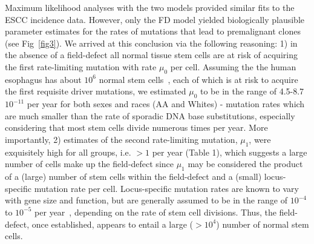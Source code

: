 \documentclass[10pt,letterpaper]{article}
\begin{document}
Maximum likelihood analyses with the two models provided similar fits to the ESCC incidence data. However, only the FD model yielded biologically plausible parameter estimates for the rates of mutations that lead to premalignant clones (see Fig~\ref{fig3}). We arrived at this conclusion via the following reasoning: 1) in the absence of a field-defect all normal tissue stem cells are at risk of acquiring the first rate-limiting mutation with rate $\mu_0$ per cell. Assuming the the human esophagus has about $10^6$ normal stem cells~\cite{Tomasetti2015}, each of which is at risk to acquire the first requisite driver mutations, we estimated $\mu_0$ to be in the range of 4.5-8.7 $10^{-11}$ per year for both sexes and races (AA and Whites) - mutation rates which are much smaller than the rate of sporadic DNA base substitutions, especially considering that most stem cells divide numerous times per year. More importantly, 2) estimates of the second rate-limiting mutation, $\mu_1$, were exquisitely high for all groups, i.e. $> 1$ per year (Table 1), which suggests a large number of cells make up the field-defect since $\mu_1$ may be considered the product of a (large) number of stem cells within the field-defect and a (small) locus-specific mutation rate per cell. Locus-specific mutation rates are known to vary with gene size and function, but are generally assumed to be in the range of $10^{-4}$ to $10^{-5}$ per year~\cite{Drake1998}, depending on the rate of stem cell divisions. Thus, the field-defect, once established, appears to entail a large ($>10^4$) number of normal stem cells. 
\end{document}

